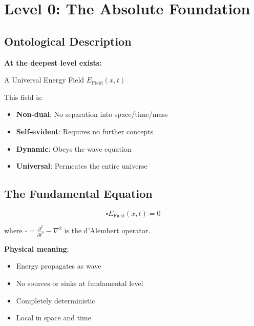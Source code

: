 	\section{Level 0: The Absolute Foundation}
	
	\subsection{Ontological Description}
	
	\begin{keyresult}
		\textbf{At the deepest level exists:}
		
		\begin{center}
			 A Universal Energy Field $E_{\text{Field}}(x,t)$
		\end{center}
		
		\vspace{0.3cm}
		
		This field is:
		\begin{itemize}
			\item \textbf{Non-dual}: No separation into space/time/mass
			\item \textbf{Self-evident}: Requires no further concepts
			\item \textbf{Dynamic}: Obeys the wave equation
			\item \textbf{Universal}: Permeates the entire universe
		\end{itemize}
	\end{keyresult}
	
	\subsection{The Fundamental Equation}
	
	\begin{equation}
		\boxed{\square E_{\text{Field}}(x,t) = 0}
	\end{equation}
	
	where $\square = \frac{\partial^2}{\partial t^2} - \nabla^2$ is the d'Alembert operator.
	
	\textbf{Physical meaning}:
	\begin{itemize}
		\item Energy propagates as wave
		\item No sources or sinks at fundamental level
		\item Completely deterministic
		\item Local in space and time
	\end{itemize}
	

